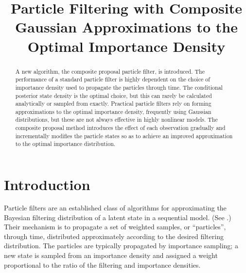 \documentclass[conference]{IEEEtran}
\begin{document}
\title{Particle Filtering with Composite Gaussian Approximations to the Optimal Importance Density}
\author{
\and
{}
}

\maketitle

\begin{abstract}
A new algorithm, the composite proposal particle filter, is introduced. The performance of a standard particle filter is highly dependent on the choice of importance density used to propagate the particles through time. The conditional posterior state density is the optimal choice, but this can rarely be calculated analytically or sampled from exactly. Practical particle filters rely on forming approximations to the optimal importance density, frequently using Gaussian distributions, but these are not always effective in highly nonlinear models. The composite proposal method introduces the effect of each observation gradually and incrementally modifies the particle states so as to achieve an improved approximation to the optimal importance distribution.
\end{abstract}


\IEEEpeerreviewmaketitle



\section{Introduction}

Particle filters are an established class of algorithms for approximating the Bayesian filtering distribution of a latent state in a sequential model. (See \cite{Cappe2007,Doucet2009}.) Their mechanism is to propagate a set of weighted samples, or ``particles'', through time, distributed approximately according to the desired filtering distribution. The particles are typically propagated by importance sampling; a new state is sampled from an importance density and assigned a weight proportional to the ratio of the filtering and importance densities.
\end{document}
